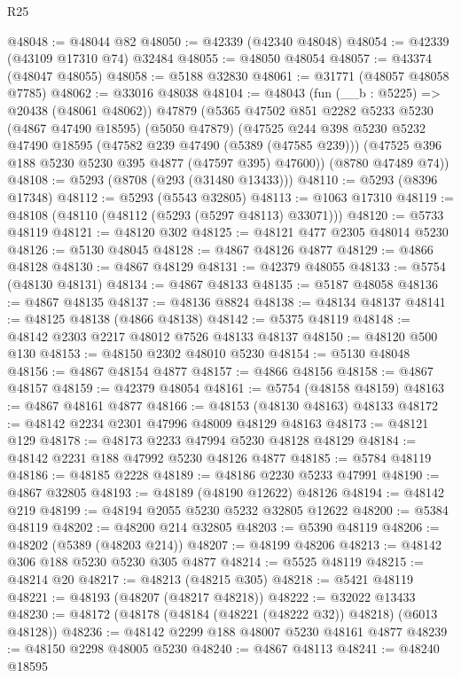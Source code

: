 \begin{lexlean}{R25}
\begin{coremodule}
@48048 := @48044 @82
@48050 := @42339 (@42340 @48048)
@48054 := @42339 (@43109 @17310 @74) @32484
@48055 := @48050 @48054
@48057 := @43374 (@48047 @48055)
@48058 := @5188 @32830
@48061 := @31771 (@48057 @48058 @7785)
@48062 := @33016 @48038
@48104 := @48043
    (fun (__b : @5225) => @20438 (@48061 @48062))
    @47879
    (@5365
      @47502
      @851
      @2282
      @5233
      @5230
      (@4867 @47490 @18595)
      (@5050 @47879)
      (@47525
        @244
        @398
        @5230
        @5232
        @47490
        @18595
        (@47582 @239 @47490 (@5389 (@47585 @239)))
        (@47525 @396 @188 @5230 @5230 @395 @4877 (@47597 @395) @47600))
      (@8780 @47489 @74))
@48108 := @5293 (@8708 (@293 (@31480 @13433)))
@48110 := @5293 (@8396 @17348)
@48112 := @5293 (@5543 @32805)
@48113 := @1063 @17310
@48119 := @48108 (@48110 (@48112 (@5293 (@5297 @48113) @33071)))
@48120 := @5733 @48119
@48121 := @48120 @302
@48125 := @48121 @477 @2305 @48014 @5230
@48126 := @5130 @48045
@48128 := @4867 @48126 @4877
@48129 := @4866 @48128
@48130 := @4867 @48129
@48131 := @42379 @48055
@48133 := @5754 (@48130 @48131)
@48134 := @4867 @48133
@48135 := @5187 @48058
@48136 := @4867 @48135
@48137 := @48136 @8824
@48138 := @48134 @48137
@48141 := @48125 @48138 (@4866 @48138)
@48142 := @5375 @48119
@48148 := @48142 @2303 @2217 @48012 @7526 @48133 @48137
@48150 := @48120 @500 @130
@48153 := @48150 @2302 @48010 @5230
@48154 := @5130 @48048
@48156 := @4867 @48154 @4877
@48157 := @4866 @48156
@48158 := @4867 @48157
@48159 := @42379 @48054
@48161 := @5754 (@48158 @48159)
@48163 := @4867 @48161 @4877
@48166 := @48153 (@48130 @48163) @48133
@48172 := @48142 @2234 @2301 @47996 @48009 @48129 @48163
@48173 := @48121 @129
@48178 := @48173 @2233 @47994 @5230 @48128 @48129
@48184 := @48142 @2231 @188 @47992 @5230 @48126 @4877
@48185 := @5784 @48119
@48186 := @48185 @2228
@48189 := @48186 @2230 @5233 @47991
@48190 := @4867 @32805
@48193 := @48189 (@48190 @12622) @48126
@48194 := @48142 @219
@48199 := @48194 @2055 @5230 @5232 @32805 @12622
@48200 := @5384 @48119
@48202 := @48200 @214 @32805
@48203 := @5390 @48119
@48206 := @48202 (@5389 (@48203 @214))
@48207 := @48199 @48206
@48213 := @48142 @306 @188 @5230 @5230 @305 @4877
@48214 := @5525 @48119
@48215 := @48214 @20
@48217 := @48213 (@48215 @305)
@48218 := @5421 @48119
@48221 := @48193 (@48207 (@48217 @48218))
@48222 := @32022 @13433
@48230 := @48172 (@48178 (@48184 (@48221 (@48222 @32)) @48218) (@6013 @48128))
@48236 := @48142 @2299 @188 @48007 @5230 @48161 @4877
@48239 := @48150 @2298 @48005 @5230
@48240 := @4867 @48113
@48241 := @48240 @18595

\end{coremodule}
\end{lexlean}
